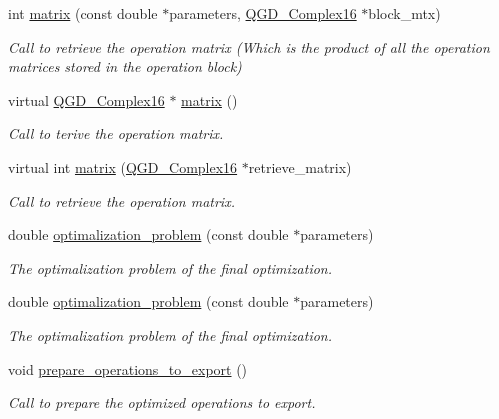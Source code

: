 \begin{DoxyCompactItemize}
int \hyperlink{class_operation__block_abf4287a38eeca35a81163f86a361d95c}{matrix} (const double $\ast$parameters, \hyperlink{struct_q_g_d___complex16}{Q\+G\+D\+\_\+\+Complex16} $\ast$block\+\_\+mtx)
\begin{DoxyCompactList}\small\item\em Call to retrieve the operation matrix (Which is the product of all the operation matrices stored in the operation block) \end{DoxyCompactList}\item 
virtual \hyperlink{struct_q_g_d___complex16}{Q\+G\+D\+\_\+\+Complex16} $\ast$ \hyperlink{class_operation_acf7d1765143285ff73772ae860109988}{matrix} ()
\begin{DoxyCompactList}\small\item\em Call to terive the operation matrix. \end{DoxyCompactList}\item 
virtual int \hyperlink{class_operation_add11c6ea2626d8dbcbd00f328a8a8279}{matrix} (\hyperlink{struct_q_g_d___complex16}{Q\+G\+D\+\_\+\+Complex16} $\ast$retrieve\+\_\+matrix)
\begin{DoxyCompactList}\small\item\em Call to retrieve the operation matrix. \end{DoxyCompactList}\item 
double \hyperlink{class_sub___matrix___decomposition_aea877119fa244d090a1ddc20d2aec431}{optimalization\+\_\+problem} (const double $\ast$parameters)
\begin{DoxyCompactList}\small\item\em The optimalization problem of the final optimization. \end{DoxyCompactList}\item 
double \hyperlink{class_sub___matrix___decomposition_aea877119fa244d090a1ddc20d2aec431}{optimalization\+\_\+problem} (const double $\ast$parameters)
\begin{DoxyCompactList}\small\item\em The optimalization problem of the final optimization. \end{DoxyCompactList}\item 
void \hyperlink{class_decomposition___base_a965838902240670119c0ad68d087c322}{prepare\+\_\+operations\+\_\+to\+\_\+export} ()
\begin{DoxyCompactList}\small\item\em Call to prepare the optimized operations to export. \end{DoxyCompactList}\item 

\end{DoxyCompactItemize}
